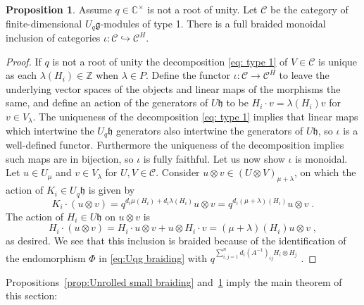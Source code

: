 \documentclass[12pt,dvipsnames]{article}
\numberwithin{equation}{section}
\theoremstyle{definition}
\newtheorem{proposition}[definition]{Proposition}
\newcommand{\cat}[1]{\mathcal{#1}}
\newcommand{\C}{\ensuremath{\mathbb{C}}}
\newcommand{\Z}{\ensuremath{\mathbb{Z}}}
\newcommand{\1}{\ensuremath{\mathbbm{1}}}
\begin{document}
\begin{proposition}\label{prop: rolled type 1 includes into unrolled}
    Assume $q\in\C^\times$ is not a root of unity. Let $\cat{C}$ be the category of finite-dimensional $U_q\mathfrak{g}$-modules of type 1. There is a full braided monoidal inclusion of categories $\iota:\cat{C}\hookrightarrow\cat{C}^H$.
\end{proposition}
\begin{proof}
    If $q$ is not a root of unity the decomposition \eqref{eq: type 1} of $V\in\cat{C}$ is unique as each $\lambda(H_i)\in\Z$ when $\lambda\in P$. Define the functor $\iota:\cat{C}\to\cat{C}^H$ 
    to leave the underlying vector spaces of the objects and linear maps of the morphisms the same, and define an action of the generators of $U\mathfrak{h}$ to be $H_i\cdot v = \lambda(H_i)v$ for $v\in V_\lambda$. The uniqueness of the decomposition \eqref{eq: type 1} implies that linear maps which intertwine the $U_q\mathfrak{h}$ generators also intertwine the generators of $U\mathfrak{h}$, so $\iota$ is a well-defined functor. Furthermore the uniqueness of the decomposition implies such maps are in bijection, so $\iota$ is fully faithful. Let us now show $\iota$ is monoidal. Let $u\in U_\mu$ and $v\in V_\lambda$ for $U,V\in\cat{C}$. Consider $u\otimes v \in (U\otimes V)_{\mu+\lambda}$, on which the action of $K_i\in U_q\mathfrak{h}$ is given by
    \begin{equation}
        K_i\cdot(u\otimes v) = q^{d_i\mu(H_i) + d_i\lambda(H_i)}u\otimes v = q^{d_i(\mu+\lambda)(H_i)} u\otimes v \;.
    \end{equation}
    The action of $H_i\in U\mathfrak{h}$ on $u\otimes v$ is
    \begin{equation}
        H_i\cdot(u\otimes v) = H_i\cdot u\otimes v + u\otimes H_i\cdot v = (\mu+\lambda)(H_i)u\otimes v \;,
    \end{equation}
    as desired. We see that this inclusion is braided because of the identification of the endomorphism $\Phi$ in \eqref{eq:Uqg braiding} with $q^{\sum_{i,j=1}^nd_i(A^{-1})_{ij}H_i\otimes H_j}$ \cite[Lem.\,40]{GP10}.
\end{proof}

Propositions~\ref{prop:Unrolled small braiding} and~\ref{prop: rolled type 1 includes into unrolled} imply the main theorem of this section:
\end{document}
